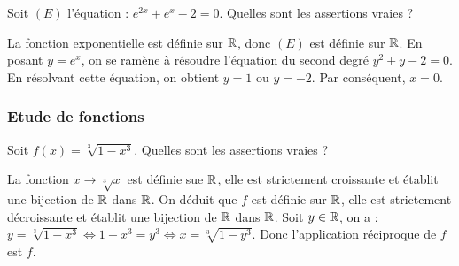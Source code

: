 \begin{question} 

Soit $(E)$ l'équation : $e^{2x}+e^x-2=0$. Quelles sont les assertions vraies ?

\begin{answers}



\end{answers}
\begin{explanations}
La fonction exponentielle est définie sur $\mathbb{R}$, donc $(E)$ est définie sur $\mathbb{R}$. 
En posant $y=e^x$, on se ramène à résoudre l'équation du second degré $y^2+y-2=0$. En résolvant cette équation, on obtient $y=1$ ou $y=-2$. Par conséquent, $x=0$.
\end{explanations}


\end{question}

\subsubsection{Etude de fonctions }

\begin{question} 

Soit $f(x)=\sqrt[3]{1-x^3}$. Quelles sont les assertions vraies ?

\begin{answers}



\end{answers}
\begin{explanations}
La fonction $x\to \sqrt[3]{x}$ est définie sue $\mathbb{R}$, elle est strictement croissante et établit une bijection de $\mathbb{R}$ dans $\mathbb{R}$. On déduit que $f$ est définie sur $\mathbb{R}$, elle est strictement décroissante et établit une bijection de $\mathbb{R}$ dans $\mathbb{R}$. Soit $y\in \mathbb{R}$, on a : $y=\sqrt[3]{1-x^3} \Leftrightarrow 1-x^3=y^3 \Leftrightarrow  x=\sqrt[3]{1-y^3}$. Donc l'application réciproque de $f$ est $f$.
\end{explanations}


\end{question}


